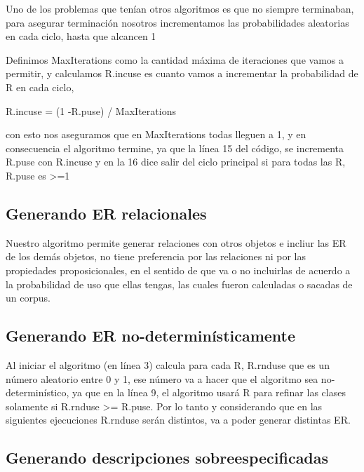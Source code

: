 Uno de los problemas que ten\'ian otros algoritmos es que no siempre terminaban, para asegurar terminaci\'on nosotros incrementamos las probabilidades aleatorias en cada ciclo, hasta que alcancen 1

Definimos MaxIterations como la cantidad m\'axima de iteraciones que vamos a permitir, y calculamos R.incuse es cuanto vamos a incrementar la probabilidad de R en cada ciclo, 

R.incuse = (1 -R.puse) / MaxIterations

con esto nos aseguramos que en MaxIterations todas lleguen a 1, y en consecuencia el algoritmo termine, ya que la l\'inea 15 del c\'odigo, se incrementa R.puse con R.incuse y en la 16 dice salir del ciclo principal si para todas las R, R.puse es >=1

\subsection{Generando ER relacionales}

Nuestro algoritmo permite generar relaciones con otros objetos e incliur las ER de los dem\'as objetos, no tiene preferencia por las relaciones ni por las propiedades proposicionales, en el sentido de que va o no incluirlas de acuerdo a la probabilidad de uso que ellas tengas, las cuales fueron calculadas o sacadas de un corpus.

\subsection{Generando ER no-determin\'isticamente}

Al iniciar el algoritmo (en l\'inea 3) calcula para cada R, R.rnduse que es un n\'umero aleatorio entre 0 y 1, ese n\'umero va a hacer que el algoritmo sea no-determin\'istico, ya que en la l\'inea 9, el algoritmo usar\'a R para refinar las clases solamente si 
R.rnduse >= R.puse. Por lo tanto y considerando que en las siguientes ejecuciones R.rnduse ser\'an distintos, va a poder generar distintas ER.

\subsection{Generando descripciones sobreespecificadas}\label{sec:overspecification}


